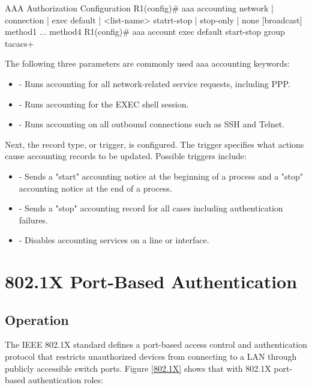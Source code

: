 \begin{sexylisting}{AAA Authorization Configuration}
R1(config)# aaa accounting {network | connection | exec} {default | <list-name>} 
                {statrt-stop | stop-only | none} [broadcast] method1 ... method4
R1(config)# aaa account exec default start-stop group tacacs+
\end{sexylisting}

The following three parameters are commonly used aaa accounting keywords:

\begin{itemize}
\item {} - Runs accounting for all network-related service requests, including PPP.
\item {} - Runs accounting for the EXEC shell session.
\item {} - Runs accounting on all outbound connections such as SSH and Telnet.
\end{itemize}

Next, the record type, or trigger, is configured. The trigger specifies what actions cause accounting records to be updated. Possible triggers include:

\begin{itemize}
\item {} - Sends a "start" accounting notice at the beginning of a process and a "stop" accounting notice at the end of a process.
\item {} - Sends a "stop" accounting record for all cases including authentication failures.
\item {} - Disables accounting services on a line or interface.
\end{itemize}
    

\section{802.1X Port-Based Authentication}

\subsection{Operation}

The IEEE 802.1X standard defines a port-based access control and authentication protocol that restricts unauthorized devices from connecting to a LAN through publicly accessible switch ports. Figure \ref{802.1X} shows that with 802.1X port-based authentication roles:

